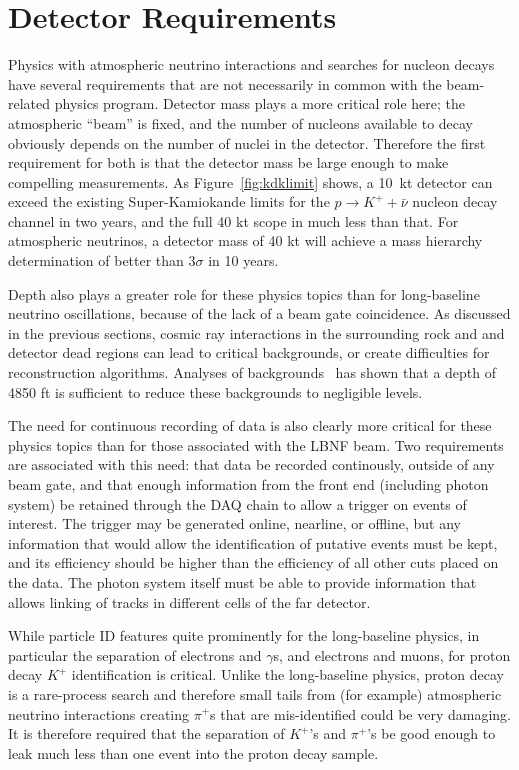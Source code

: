 \section{Detector Requirements}
\label{sec:physics-atmpdk-detector-requirements}

Physics with atmospheric neutrino interactions and searches for nucleon decays
have several requirements that are not necessarily in common with the
beam-related physics program.  Detector mass plays a more critical role here;
the atmospheric ``beam'' is fixed, and the number of nucleons available to
decay obviously depends on the number of nuclei in the detector.  Therefore the
first requirement for both is that the detector mass be large enough to make
compelling measurements. As Figure~\ref{fig:kdklimit} shows, a 10~kt detector can
exceed the existing Super-Kamiokande limits for the $p\rightarrow K^+ +
\bar{\nu}$ nucleon decay channel in two years, and the full 40 kt scope in much
less than that.  For atmospheric neutrinos, a detector mass of 40 kt will
achieve a mass hierarchy determination of better than 3$\sigma$ in 10 years.

Depth also plays a greater role for these physics topics than for long-baseline
neutrino oscillations, because of the lack of a beam gate coincidence. As
discussed in the previous sections, cosmic ray interactions in the surrounding
rock and and detector dead regions can lead to critical backgrounds, or create
difficulties for reconstruction algorithms. Analyses of
backgrounds~\cite{bueno, klinger, sciopp} has shown that a depth of 4850 ft is
sufficient to reduce these backgrounds to negligible levels.

The need for continuous recording of data is also clearly more critical for
these physics topics than for those associated with the LBNF beam.  Two
requirements are associated with this need: that data be recorded continously,
outside of any beam gate, and that enough information from the front end
(including photon system) be retained through the DAQ chain to allow a trigger
on events of interest. The trigger may be generated online, nearline, or
offline, but any information that would allow the identification of putative
events must be kept, and its efficiency should be higher than the efficiency of
all other cuts placed on the data.  The photon system itself must be able to
provide information that allows linking of tracks in different cells of the far
detector.

While particle ID features quite prominently for the long-baseline physics, in
particular the separation of electrons and $\gamma$s, and electrons and muons,
for proton decay $K^+$ identification is critical.  Unlike the long-baseline
physics, proton decay is a rare-process search and therefore small tails from
(for example) atmospheric neutrino interactions creating $\pi^+$s that are
mis-identified could be very damaging. It is therefore required that the separation
of $K^+$'s and $\pi^+$'s be good enough to leak much less than one event into the
proton decay sample.

